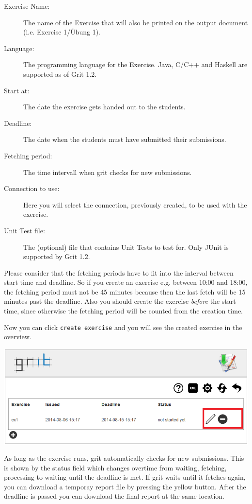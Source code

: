 \documentclass[10pt,a4paper, titlepage, toc=idx]{scrreprt}
\theoremstyle{definition}
\theoremstyle{plain}
\newcommand*{\product}{Grit}
\newcommand*{\version}{1.2}
\begin{document}
\begin{description}
	\item[Exercise Name:] The name of the Exercise that will also be printed on the output document (i.e. Exercise 1/Übung 1).
	\item[Language:] The programming language for the Exercise. Java, C/C++ and Haskell are supported as of
 \product{} \version.
	\item[Start at:] The date the exercise gets handed out to the
          students.
	\item[Deadline:] The date when the students must have submitted their submissions.
	\item[Fetching period:] The time intervall when grit checks for new submissions.
	\item[Connection to use:] Here you will select the connection, previously created, to be used with the exercise.
	\item[Unit Test file:] The (optional) file that contains Unit Tests to test for. Only JUnit is supported by \product{}
          \version.
	\end{description}
Please consider that the fetching periods have to fit into the interval between start time and deadline. So if you create an exercise e.g. between 10:00 and 18:00, the fetching period must not be 45 minutes because then the last fetch will be 15 minutes past the deadline. Also you should create the exercise \emph{before} the start time, since otherwise the fetching period will be counted from the creation time.

Now you can click {\tt create exercise} and you will see the created exercise in the overview. 

\begin{center}
	\includegraphics[width=.55\textwidth]{pictures/exercise_overview2.png}
\end{center}

As long as the exercise runs, grit automatically checks for new submissions. This is shown by the status field which changes overtime from waiting, fetching, processing to waiting until the deadline is met. If grit waits until it fetches again, you can download a temporay report file by pressing the yellow button. After the deadline is passed you can download the final report at the same location.
\end{document}
